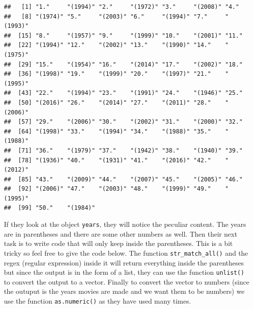 \documentclass[]{book}
\newenvironment{Shaded}{\begin{snugshade}}{\end{snugshade}}
\newcommand{\CharTok}[1]{\textcolor[rgb]{0.31,0.60,0.02}{#1}}
\newcommand{\KeywordTok}[1]{\textcolor[rgb]{0.13,0.29,0.53}{\textbf{#1}}}
\newcommand{\NormalTok}[1]{#1}
\newcommand{\OperatorTok}[1]{\textcolor[rgb]{0.81,0.36,0.00}{\textbf{#1}}}
\newcommand{\StringTok}[1]{\textcolor[rgb]{0.31,0.60,0.02}{#1}}
\begin{document}
\begin{verbatim}
##   [1] "1."     "(1994)" "2."     "(1972)" "3."     "(2008)" "4."    
##   [8] "(1974)" "5."     "(2003)" "6."     "(1994)" "7."     "(1993)"
##  [15] "8."     "(1957)" "9."     "(1999)" "10."    "(2001)" "11."   
##  [22] "(1994)" "12."    "(2002)" "13."    "(1990)" "14."    "(1975)"
##  [29] "15."    "(1954)" "16."    "(2014)" "17."    "(2002)" "18."   
##  [36] "(1998)" "19."    "(1999)" "20."    "(1997)" "21."    "(1995)"
##  [43] "22."    "(1994)" "23."    "(1991)" "24."    "(1946)" "25."   
##  [50] "(2016)" "26."    "(2014)" "27."    "(2011)" "28."    "(2006)"
##  [57] "29."    "(2006)" "30."    "(2002)" "31."    "(2000)" "32."   
##  [64] "(1998)" "33."    "(1994)" "34."    "(1988)" "35."    "(1988)"
##  [71] "36."    "(1979)" "37."    "(1942)" "38."    "(1940)" "39."   
##  [78] "(1936)" "40."    "(1931)" "41."    "(2016)" "42."    "(2012)"
##  [85] "43."    "(2009)" "44."    "(2007)" "45."    "(2005)" "46."   
##  [92] "(2006)" "47."    "(2003)" "48."    "(1999)" "49."    "(1995)"
##  [99] "50."    "(1984)"
\end{verbatim}

If they look at the object \texttt{years}, they will notice the peculiar content. The years are in parentheses and there are some other numbers as well. Then their next task is to write code that will only keep inside the parentheses. This is a bit tricky so feel free to give the code below. The function \texttt{str\_match\_all()} and the regex (regular expression) inside it will return everything inside the parentheses but since the output is in the form of a list, they can use the function \texttt{unlist()} to convert the output to a vector. Finally to convert the vector to numbers (since the outuput is the years movies are made and we want them to be numbers) we use the function \texttt{as.numeric()} as they have used many times.

\begin{Shaded}
\end{Shaded}
\end{document}
